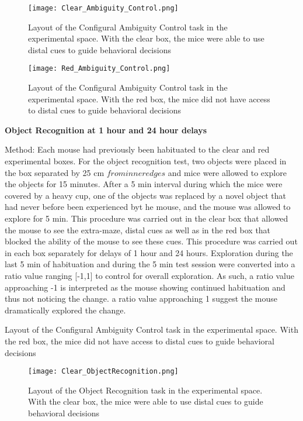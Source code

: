 \documentclass{article}
\begin{document}
\begin{figure}[h!]
\centering
\texttt{[image: Clear\_Ambiguity\_Control.png]}
\caption{Layout of the Configural Ambiguity Control task in the experimental space. With the clear box, the mice were able to use distal cues to guide behavioral decisions}
\label{fig:Ambiguity Control}
\end{figure}

\begin{figure}[h!]
\centering
\texttt{[image: Red\_Ambiguity\_Control.png]}
\caption{Layout of the Configural Ambiguity Control task in the experimental space. With the red box, the mice did not have access to distal cues to guide behavioral decisions}
\label{fig:Ambiguity Control}
\end{figure}

\textbf{Object Recognition at 1 hour and 24 hour delays}

Method:
Each mouse had previously been habituated to the clear and red experimental boxes. For the object recognition test, two objects were placed in the box separated by 25 cm \(from inner edges\) and mice were allowed to explore the objects for 15 minutes. After a 5 min interval during which the mice were covered by a heavy cup, one of the objects was replaced by a novel object that had never before been experienced byt he mouse, and the mouse was allowed to explore for 5 min. This procedure was carried out in the clear box that allowed the mouse to see the extra-maze, distal cues as well as in the red box that blocked the ability of the mouse to see these cues. This procedure was carried out in each box separately for delays of 1 hour and 24 hours. Exploration during the last 5 min of habituation and during the 5 min test session were converted into a ratio value ranging [-1,1] to control for overall exploration. As such, a ratio value approaching -1 is interpreted as the mouse showing continued habituation and thus not noticing the change. a ratio value approaching 1 suggest the mouse dramatically explored the change.

Layout of the Configural Ambiguity Control task in the experimental space. With the red box, the mice did not have access to distal cues to guide behavioral decisions

\begin{figure}[h!]
\centering
\texttt{[image: Clear\_ObjectRecognition.png]}
\caption{Layout of the Object Recognition task in the experimental space. With the clear box, the mice were able to use distal cues to guide behavioral decisions}
\label{fig:Ambiguity Control}
\end{figure}
\end{document}
